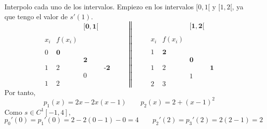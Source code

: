 \begin{ejercicio}
    Interpolo cada uno de los intervalos. Empiezo en los intervalos $[0,1[$ y $[1,2[$, ya que tengo el valor de $s'(1)$.
    \begin{equation*}
        \begin{array}{c|ccc}
            &&\mathbf{[0,1[} \\ \\
            x_i & f(x_i) \\ \\
            0 & \textbf{0} \\
            && \textbf{2} \\ 
            1 & 2 && \textbf{-2}\\
            && 0\\
            1 & 2
        \end{array}
        \qquad \left\|\qquad
        \begin{array}{c|ccc}
            &&\mathbf{[1,2[} \\ \\
            x_i & f(x_i) \\ \\
            1 & \textbf{2} \\
            && \textbf{0} \\ 
            1 & 2 && \textbf{1}\\
            && 1\\
            2 & 3
        \end{array}\right.
    \end{equation*}
    Por tanto,
    \begin{equation*}
        p_1(x)=2x -2x(x-1) \qquad p_2(x)=2 +(x-1)^2
    \end{equation*}
    Como $s\in C^{1}[-1, 4]$,
    \begin{equation*}
        p_0'(0)=p_1'(0)=2-2(0-1)-0 = 4 \qquad 
        p_2'(2)=p_3'(2)=2(2-1) = 2
    \end{equation*}


\end{ejercicio}
